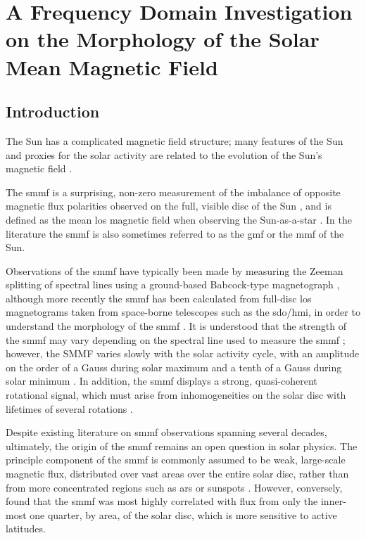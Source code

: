 \chapter{A Frequency Domain Investigation on the Morphology of the Solar Mean Magnetic Field}\label{chap:SMMF}

\section{Introduction}\label{sec:SMMF_intro}

The Sun has a complicated magnetic field structure; many features of the Sun and proxies for the solar activity are related to the evolution of the Sun's magnetic field \citep{wu_solar_2018}.

The \gls{smmf} is a surprising, non-zero measurement of the imbalance of opposite magnetic flux polarities observed on the full, visible disc of the Sun \citep{svalgaard_suns_1975}, and is defined as the mean \gls{los} magnetic field when observing the Sun-as-a-star \citep{scherrer_mean_1977, scherrer_mean_1977-1, garcia_integrated_1999}. In the literature the \gls{smmf} is also sometimes referred to as the \gls{gmf} \citep{severny_time_1971} or the \gls{mmf} \citep{kotov_mean_2008} of the Sun.

Observations of the \gls{smmf} have typically been made by measuring the Zeeman splitting of spectral lines using a ground-based Babcock-type magnetograph \citep{scherrer_mean_1977}, although more recently the \gls{smmf} has been calculated from full-disc \gls{los} magnetograms taken from space-borne telescopes such as the \gls{sdo/hmi}, in order to understand the morphology of the \gls{smmf} \citep{kutsenko_contribution_2017, bose_variability_2018}. It is understood that the strength of the \gls{smmf} may vary depending on the spectral line used to measure the \gls{smmf} \citep{kotov_mean_2008, kotov_enigmas_2012}; however, the SMMF varies slowly with the solar activity cycle, with an amplitude on the order of a Gauss during solar maximum and a tenth of a Gauss during solar minimum \citep{plachinda_general_2011}. In addition, the \gls{smmf} displays a strong, quasi-coherent rotational signal, which must arise from inhomogeneities on the solar disc with lifetimes of several rotations \citep{chaplin_studies_2003, xie_temporal_2017}.

Despite existing literature on \gls{smmf} observations spanning several decades, ultimately, the origin of the \gls{smmf} remains an open question in solar physics. The principle component of the \gls{smmf} is commonly assumed to be weak, large-scale magnetic flux, distributed over vast areas over the entire solar disc, rather than from more concentrated regions such as \glspl{ar} or sunspots \citep{severny_time_1971, scherrer_mean_1977, xiang_ensemble_2016}. However, conversely, \citet{scherrer_mean_1972} found that the \gls{smmf} was most highly correlated with flux from only the inner-most one quarter, by area, of the solar disc, which is more sensitive to active latitudes.

